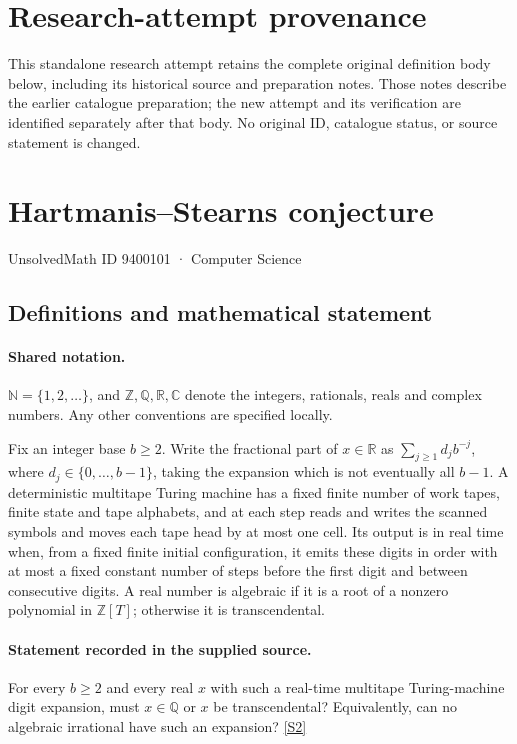 \documentclass[11pt]{article}
\begin{document}
\section*{Research-attempt provenance}
This standalone research attempt retains the complete original definition body below,
including its historical source and preparation notes. Those notes describe the
earlier catalogue preparation; the new attempt and its verification are identified
separately after that body. No original ID, catalogue status, or source statement is changed.

\section{Hartmanis–Stearns conjecture}\label{9400101}
{\small UnsolvedMath ID 9400101 · Computer Science}
\subsection{Definitions and mathematical statement}

\paragraph{Shared notation.}$\mathbb N=\{1,2,\ldots\}$, and $\mathbb Z,\mathbb Q,\mathbb R,\mathbb C$ denote the integers, rationals, reals and complex numbers. Any other conventions are specified locally.


Fix an integer base $b\ge2$. Write the fractional part of $x\in\mathbb R$ as $\sum_{j\ge1}d_jb^{-j}$, where $d_j\in\{0,\ldots,b-1\}$, taking the expansion which is not eventually all $b-1$. A deterministic multitape Turing machine has a fixed finite number of work tapes, finite state and tape alphabets, and at each step reads and writes the scanned symbols and moves each tape head by at most one cell. Its output is in real time when, from a fixed finite initial configuration, it emits these digits in order with at most a fixed constant number of steps before the first digit and between consecutive digits. A real number is algebraic if it is a root of a nonzero polynomial in $\mathbb Z[T]$; otherwise it is transcendental.
\paragraph{Statement recorded in the supplied source.}
For every $b\ge2$ and every real $x$ with such a real-time multitape Turing-machine digit expansion, must $x\in\mathbb Q$ or $x$ be transcendental? Equivalently, can no algebraic irrational have such an expansion? \href{https://arxiv.org/pdf/1803.10267}{[S2]}
\end{document}

